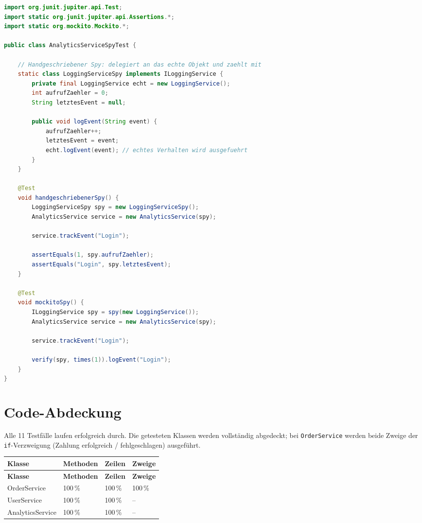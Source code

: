 \documentclass[
	fontsize=12pt,          %
	paper=a4,               %
	numbers=noenddot,       %
	listof=totoc,           %
	listof=entryprefix,     %
	listof=nochaptergap,    %
	bibliography=totoc,     %
	parskip=half,           %
	openany                 %
]{scrbook}
\begin{document}
\begin{lstlisting}[language=Java]
import org.junit.jupiter.api.Test;
import static org.junit.jupiter.api.Assertions.*;
import static org.mockito.Mockito.*;

public class AnalyticsServiceSpyTest {

    // Handgeschriebener Spy: delegiert an das echte Objekt und zaehlt mit
    static class LoggingServiceSpy implements ILoggingService {
        private final LoggingService echt = new LoggingService();
        int aufrufZaehler = 0;
        String letztesEvent = null;

        public void logEvent(String event) {
            aufrufZaehler++;
            letztesEvent = event;
            echt.logEvent(event); // echtes Verhalten wird ausgefuehrt
        }
    }

    @Test
    void handgeschriebenerSpy() {
        LoggingServiceSpy spy = new LoggingServiceSpy();
        AnalyticsService service = new AnalyticsService(spy);

        service.trackEvent("Login");

        assertEquals(1, spy.aufrufZaehler);
        assertEquals("Login", spy.letztesEvent);
    }

    @Test
    void mockitoSpy() {
        ILoggingService spy = spy(new LoggingService());
        AnalyticsService service = new AnalyticsService(spy);

        service.trackEvent("Login");

        verify(spy, times(1)).logEvent("Login");
    }
}
\end{lstlisting}


\chapter*{Code-Abdeckung}

Alle 11 Testfälle laufen erfolgreich durch. Die getesteten Klassen werden
vollständig abgedeckt; bei \texttt{OrderService} werden beide Zweige der
\texttt{if}-Verzweigung (Zahlung erfolgreich / fehlgeschlagen) ausgeführt.

\begin{longtable}{| p{4.5cm} | p{2.5cm} | p{2.5cm} | p{2.5cm} |}
	\hline
	\textbf{Klasse} & \textbf{Methoden} & \textbf{Zeilen} & \textbf{Zweige} \\ \hline
	\endfirsthead
	\hline
	\textbf{Klasse} & \textbf{Methoden} & \textbf{Zeilen} & \textbf{Zweige} \\ \hline
	\endhead
	\hline
	\endfoot
	OrderService    & 100\,\% & 100\,\% & 100\,\% \\ \hline
	UserService     & 100\,\% & 100\,\% & --      \\ \hline
	AnalyticsService& 100\,\% & 100\,\% & --      \\ \hline
\end{longtable}

\end{document}
